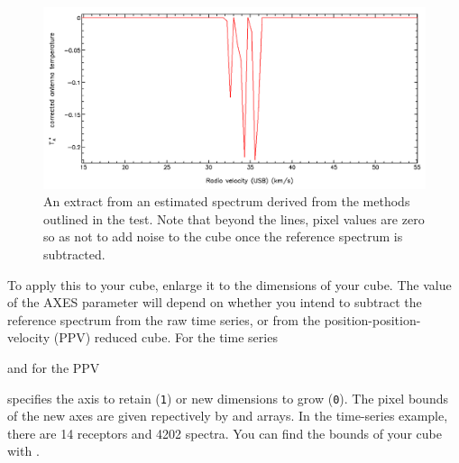 \documentclass[11pt,oneside,chapters]{starlink}
\begin{document}
\begin{figure}[h!]
\begin{center}
\includegraphics[width=0.9\linewidth]{sc20_refspec_manual}
\caption[An estimated reference spectrum]{\label{fig::estimated_refspec}
  An extract from an estimated spectrum derived from the methods outlined
  in the test. Note that beyond the lines, pixel values are zero so as
  not to add noise to the cube once the reference spectrum is subtracted.}
\end{center}
\end{figure}

To apply this to your cube, enlarge it to the dimensions of your cube.
The value of the AXES parameter will depend on whether you intend to
subtract the reference spectrum from the raw time series, or from the
position-position-velocity (PPV) reduced cube.  For the time series

\begin{terminalv}
\end{terminalv}

and for the PPV
\begin{terminalv}
\end{terminalv}

 specifies the axis to retain (\texttt{1}) or new
dimensions to grow (\texttt{0}).  The pixel bounds of the new axes are
given repectively by  and  arrays.  In the
time-series example, there are 14 receptors and 4202 spectra.  You can
find the bounds of your cube with \ndftrace.

\begin{terminalv}
\end{terminalv}
\end{document}
